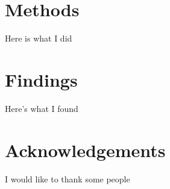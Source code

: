 \documentclass[3p, authoryear]{elsarticle} %
\begin{document}
\hypertarget{methods}{%
\section{Methods}\label{methods}}

Here is what I did

\hypertarget{findings}{%
\section{Findings}\label{findings}}

Here's what I found

\hypertarget{acknowledgements}{%
\section*{Acknowledgements}\label{acknowledgements}}

I would like to thank some people


\end{document}
